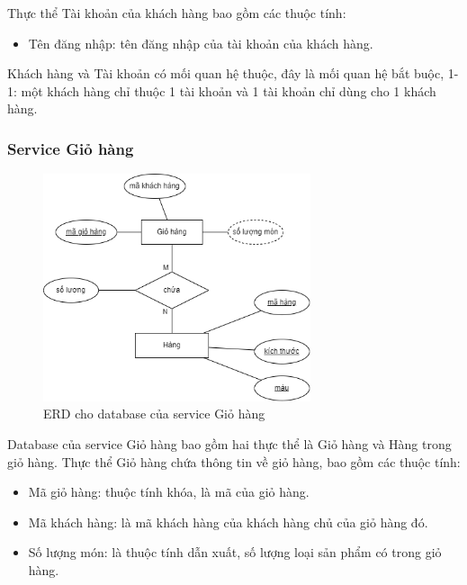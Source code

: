 \par Thực thể Tài khoản của khách hàng bao gồm các thuộc tính:
\begin{itemize}
	\item Tên đăng nhập: tên đăng nhập của tài khoản của khách hàng.
\end{itemize}

\par Khách hàng và Tài khoản có mối quan hệ thuộc, đây là mối quan hệ bắt buộc, 1-1: một khách hàng chỉ thuộc 1 tài khoản và 1 tài khoản chỉ dùng cho 1 khách hàng.

\subsubsection{Service Giỏ hàng}
\begin{figure}[!htp]
	\begin{center}
		\includegraphics[width=0.7\textwidth]{img/database/erd/eerd-cart.png}
		\newline
		\caption{ERD cho database của service Giỏ hàng}
	\end{center}
\end{figure}

\par Database của service Giỏ hàng bao gồm hai thực thể là Giỏ hàng và Hàng trong giỏ hàng. Thực thể Giỏ hàng chứa thông tin về giỏ hàng, bao gồm các thuộc tính:
\begin{itemize}
	\item Mã giỏ hàng: thuộc tính khóa, là mã của giỏ hàng.
	\item Mã khách hàng: là mã khách hàng của khách hàng chủ của giỏ hàng đó.
	\item Số lượng món: là thuộc tính dẫn xuất, số lượng loại sản phẩm có trong giỏ hàng.
\end{itemize}

